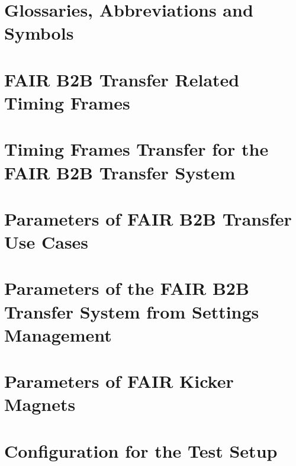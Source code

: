 \documentclass[12pt,twoside]{report}
\renewcommand{\_}{%
  \textunderscore\hspace{0pt}%
}
\begin{document}
\setcounter{table}{0}
\renewcommand{\thetable}{\Alph{chapter}.\arabic{table}}
\renewcommand{\tablename}{Table}
\appendix
\chapter*{Glossaries, Abbreviations and Symbols}
\printnoidxglossary

\printnoidxglossary[type=termslist,style=long]
\printnoidxglossary[type=abbreslist,style=long]
\printnoidxglossary[type=symbolslist,style=long]


\chapter{FAIR B2B Transfer Related Timing Frames}


\chapter{Timing Frames Transfer for the FAIR B2B Transfer System}


\chapter{Parameters of FAIR B2B Transfer Use Cases}

\chapter{Parameters of the FAIR B2B Transfer System from Settings Management}

\chapter{Parameters of FAIR Kicker Magnets}

\chapter{Configuration for the Test Setup}

\end{document}

